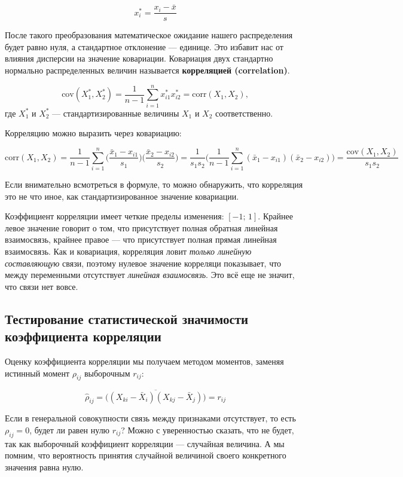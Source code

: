 \documentclass[
  letterpaper,
  DIV=11,
  numbers=noendperiod]{scrreprt}
\theoremstyle{definition}
\theoremstyle{remark}
\begin{document}
\[
x_i^* = \frac{x_i - \bar x}{s}
\]

После такого преобразования математическое ожидание нашего распределения
будет равно нуля, а стандартное отклонение --- единице. Это избавит нас
от влияния дисперсии на значение ковариации. Ковариация двух стандартно
нормально распределенных величин называется \textbf{корреляцией
(correlation)}.

\[
\mathrm{cov}(X_1^*, X_2^*) = \frac{1}{n-1} \sum_{i=1}^n x_{i1}^* x_{i2}^* = \mathrm{corr}(X_1, X_2),
\] где \(X_1^*\) и \(X_2^*\) --- стандартизированные величины \(X_1\) и
\(X_2\) соответственно.

Корреляцию можно выразить через ковариацию:

\[
\mathrm{corr}(X_1, X_2) = \frac{1}{n-1} \sum_{i=1}^n \Big( \frac{\bar x_1 - x_{i1}}{s_1} \Big) \Big( \frac{\bar x_2 - x_{i2}}{s_2} \Big) = 
\frac{1}{s_1 s_2} \Big( \frac{1}{n-1} \sum_{i=1}^n (\bar x_1 - x_{i1})(\bar x_2 - x_{i2}) \Big) = \frac{\mathrm{cov}(X_1, X_2)}{s_1 s_2}
\]

Если внимательно всмотреться в формуле, то можно обнаружить, что
корреляция это не что иное, как стандартизированное значение ковариации.

Коэффициент корреляции имеет четкие пределы изменения: \([-1; \,1]\).
Крайнее левое значение говорит о том, что присутствует полная обратная
линейная взаимосвязь, крайнее правое --- что присутствует полная прямая
линейная взаимосвязь. Как и ковариация, корреляция ловит \emph{только
линейную составляющую} связи, поэтому нулевое значение корреляци
показывает, что между переменными отсутствует \emph{линейная
взаимосвязь}. Это всё еще не значит, что связи нет вовсе.

\subsection{Тестирование статистической значимости коэффициента
корреляции}\label{andan-corr-test}

Оценку коэффициента корреляции мы получаем методом моментов, заменяя
истинный момент \(\rho_{ij}\) выборочным \(r_{ij}\):

\[
\hat \rho_{ij} = \overline{\big( (X_{ki} - \bar X_i) (X_{kj} - \bar X_j) \big)} = r_{ij}
\]

Если в генеральной совокупности связь между признаками отсутствует, то
есть \(\rho_{ij} = 0\), будет ли равен нулю \(r_{ij}\)? Можно с
уверенностью сказать, что не будет, так как выборочный коэффициент
корреляции --- случайная величина. А мы помним, что вероятность принятия
случайной величиной своего конкретного значения равна нулю.
\end{document}
